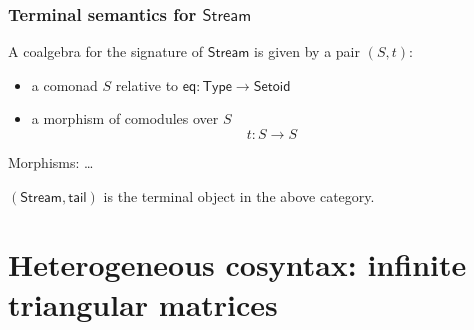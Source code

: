 \documentclass[
]
{beamer}
\newcommand{\constfont}[1]{\ensuremath{\mathsf{#1}}}
\newcommand{\stream}{\constfont{Stream}}
\newcommand{\stail}{\constfont{tail}}
\newcommand{\Setoid}{\constfont{Setoid}}
\newcommand{\eq}{\ensuremath{\mathsf{eq}}}
\newcommand{\Set}{\constfont{Type}}
\begin{document}
\begin{frame}
 \frametitle{Terminal semantics for $\stream$}
 
  \begin{definition}
    A coalgebra for the signature of $\stream$ is given by a pair $(S,t)$:
    \begin{itemize}
     \item a comonad $S$ relative to $\eq: \Set \to \Setoid$
     \item a morphism of comodules over $S$
        \[  t : S \to S \]
    \end{itemize}
   Morphisms: \ldots
  \end{definition}

 \begin{lemma}
  $(\stream,\stail)$ is the terminal object in the above category.
 \end{lemma}
  
\end{frame}


\section{Heterogeneous cosyntax: infinite triangular matrices}
\end{document}
